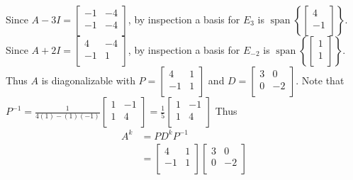 \documentclass{article}
\DeclareMathOperator{\spn}{span}
\begin{document}
\begin{example}
  Since $A - 3I =
    \begin{bmatrix}
      -1 & -4 \\
      -1 & -4 \\
    \end{bmatrix}$, by inspection a basis for $E_3$ is $\spn\left\{
    \begin{bmatrix}
      4 \\-1\\
    \end{bmatrix}\right\}$. Since $A + 2I =
    \begin{bmatrix}
      4  & -4 \\
      -1 & 1  \\
    \end{bmatrix}$, by inspection a basis for $E_{-2}$ is $\spn\left\{
    \begin{bmatrix}
      1 \\1\\
    \end{bmatrix}\right\}$. Thus $A$ is diagonalizable with $P =
    \begin{bmatrix}
      4  & 1 \\
      -1 & 1 \\
    \end{bmatrix}$ and $D =
    \begin{bmatrix}
      3 & 0  \\
      0 & -2 \\
    \end{bmatrix}$. Note that $P^{-1} = \frac{1}{4(1) - (1)(-1)}
    \begin{bmatrix}
      1 & -1 \\
      1 & 4  \\
    \end{bmatrix} = \frac{1}{5}
    \begin{bmatrix}
      1 & -1 \\
      1 & 4  \\
    \end{bmatrix}$
  Thus
  \begin{align*}
    A^k & = PD^kP^{-1}  \\
        & =
    \begin{bmatrix}
      4  & 1 \\
      -1 & 1 \\
    \end{bmatrix}
    \begin{bmatrix}
      3 & 0  \\
      0 & -2 \\

\end{bmatrix}
\end{align*}
\end{example}
\end{document}
